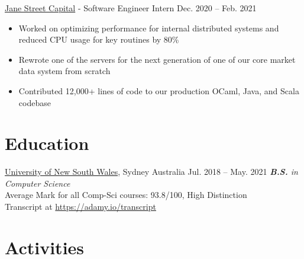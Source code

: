 \documentclass[hidelinks__VERSION__]{adamyi-cv}
\begin{document}
\begin{entrylist}

\entry
{\href{https://www.janestreet.com/}{Jane Street Capital} - Software Engineer Intern}
{Dec. 2020 -- Feb. 2021}
{
\begin{minipage}[t]{1\linewidth}
\begin{itemize}[leftmargin=*,align=left,noitemsep]
\item Worked on optimizing performance for internal distributed systems and reduced CPU usage for key routines by 80\%
\item Rewrote one of the servers for the next generation of one of our core market data system from scratch
\item Contributed 12,000+ lines of code to our production OCaml, Java, and Scala codebase
\end{itemize}
\end{minipage}
}

\end{entrylist}


\section{Education}

\begin{entrylist}


\entry
{\href{https://unsw.edu.au}{University of New South Wales}, Sydney Australia}
{Jul. 2018 -- May. 2021}
{\emph{\textbf{B.S.} in Computer Science}\\
Average Mark for all Comp-Sci courses: 93.8/100, High Distinction\\
Transcript at \href{https://adamy.io/transcript}{https://adamy.io/transcript}
}

\end{entrylist}



\section{Activities}
\end{document}
